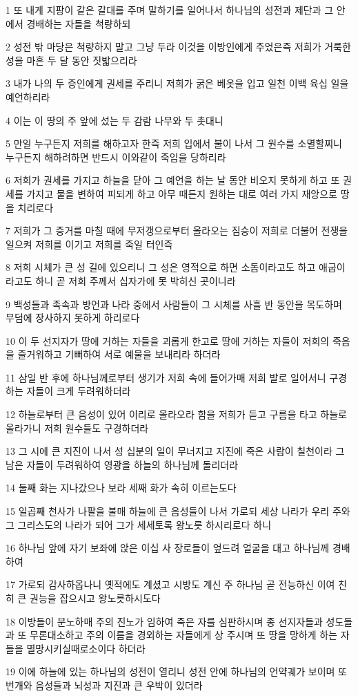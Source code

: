 \par 1 또 내게 지팡이 같은 갈대를 주며 말하기를 일어나서 하나님의 성전과 제단과 그 안에서 경배하는 자들을 척량하되
\par 2 성전 밖 마당은 척량하지 말고 그냥 두라 이것을 이방인에게 주었은즉 저희가 거룩한 성을 마흔 두 달 동안 짓밟으리라
\par 3 내가 나의 두 증인에게 권세를 주리니 저희가 굵은 베옷을 입고 일천 이백 육십 일을 예언하리라
\par 4 이는 이 땅의 주 앞에 섰는 두 감람 나무와 두 촛대니
\par 5 만일 누구든지 저희를 해하고자 한즉 저희 입에서 불이 나서 그 원수를 소멸할찌니 누구든지 해하려하면 반드시 이와같이 죽임을 당하리라
\par 6 저희가 권세를 가지고 하늘을 닫아 그 예언을 하는 날 동안 비오지 못하게 하고 또 권세를 가지고 물을 변하여 피되게 하고 아무 때든지 원하는 대로 여러 가지 재앙으로 땅을 치리로다
\par 7 저희가 그 증거를 마칠 때에 무저갱으로부터 올라오는 짐승이 저희로 더불어 전쟁을 일으켜 저희를 이기고 저희를 죽일 터인즉
\par 8 저희 시체가 큰 성 길에 있으리니 그 성은 영적으로 하면 소돔이라고도 하고 애굽이라고도 하니 곧 저희 주께서 십자가에 못 박히신 곳이니라
\par 9 백성들과 족속과 방언과 나라 중에서 사람들이 그 시체를 사흘 반 동안을 목도하며 무덤에 장사하지 못하게 하리로다
\par 10 이 두 선지자가 땅에 거하는 자들을 괴롭게 한고로 땅에 거하는 자들이 저희의 죽음을 즐거워하고 기뻐하여 서로 예물을 보내리라 하더라
\par 11 삼일 반 후에 하나님께로부터 생기가 저희 속에 들어가매 저희 발로 일어서니 구경하는 자들이 크게 두려워하더라
\par 12 하늘로부터 큰 음성이 있어 이리로 올라오라 함을 저희가 듣고 구름을 타고 하늘로 올라가니 저희 원수들도 구경하더라
\par 13 그 시에 큰 지진이 나서 성 십분의 일이 무너지고 지진에 죽은 사람이 칠천이라 그 남은 자들이 두려워하여 영광을 하늘의 하나님께 돌리더라
\par 14 둘째 화는 지나갔으나 보라 세째 화가 속히 이르는도다
\par 15 일곱째 천사가 나팔을 불매 하늘에 큰 음성들이 나서 가로되 세상 나라가 우리 주와 그 그리스도의 나라가 되어 그가 세세토록 왕노릇 하시리로다 하니
\par 16 하나님 앞에 자기 보좌에 앉은 이십 사 장로들이 엎드려 얼굴을 대고 하나님께 경배하여
\par 17 가로되 감사하옵나니 옛적에도 계셨고 시방도 계신 주 하나님 곧 전능하신 이여 친히 큰 권능을 잡으시고 왕노릇하시도다
\par 18 이방들이 분노하매 주의 진노가 임하여 죽은 자를 심판하시며 종 선지자들과 성도들과 또 무론대소하고 주의 이름을 경외하는 자들에게 상 주시며 또 땅을 망하게 하는 자들을 멸망시키실때로소이다 하더라
\par 19 이에 하늘에 있는 하나님의 성전이 열리니 성전 안에 하나님의 언약궤가 보이며 또 번개와 음성들과 뇌성과 지진과 큰 우박이 있더라

